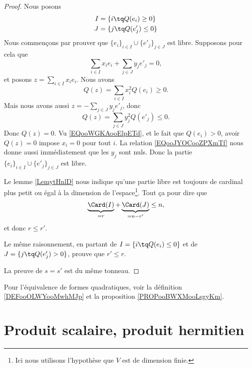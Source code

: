 \begin{proof}
	Nous posons
	\begin{subequations}
		\begin{align}
			I & =\{ i\tq Q(e_i)\geq 0 \}  \\
			J & =\{ j\tq Q(e_j')\leq 0 \}
		\end{align}
	\end{subequations}
	Nous commençons par prouver que \( \{ e_i \}_{i\in I}\cup\{ e'_j \}_{j\in J}\) est libre. Supposons pour cela que
	\begin{equation}
		\sum_{i\in I}x_ie_i+\sum_{j\in J}y_je'_j=0,
	\end{equation}
	et posons \( z=\sum_{i\in I}x_ie_i\). Nous avons
	\begin{equation}        \label{EQooWGKAooElpETd}
		Q(z)=\sum_{i\in I}x_i^2Q(e_i)\geq 0.
	\end{equation}
	Mais nous avons aussi \( z=-\sum_{j\in J}y_je'_j\), donc
	\begin{equation}        \label{EQooJYOCooZPXmTf}
		Q(z)=\sum_{j\in J}y_j^2Q(e'_j)\leq 0.
	\end{equation}
	Donc \( Q(z)=0\). Vu \eqref{EQooWGKAooElpETd}, et le fait que \( Q(e_i)>0\), avoir \( Q(z)=0\) impose \( x_i=0\) pour tout \( i\). La relation \eqref{EQooJYOCooZPXmTf} nous donne aussi immédiatement que les \( y_j\) sont nuls. Donc la partie \( \{ e_i \}_{i\in I}\cup\{ e'_j \}_{j\in J}\) est libre.

	Le lemme \ref{LemytHnlD} nous indique qu'une partie libre est toujours de cardinal plus petit ou égal à la dimension de l'espace\footnote{Ici nous utilisons l'hypothèse que \( V\) est de dimension finie.}. Tout ça pour dire que
	\begin{equation}
		\underbrace{\Card(I)}_{=r}+\underbrace{\Card(J)}_{=n-r'}\leq n,
	\end{equation}
	et donc \( r\leq r'\).

	Le même raisonnement, en partant de \( I=\{ i\tq Q(e_i)\leq 0 \}\) et de \( J=\{ j\tq Q(e'_j)>0 \}\), prouve que \( r'\leq r\).

	La preuve de \( s=s'\) est du même tonneau.
\end{proof}

Pour l'équivalence de formes quadratiques, voir la définition \ref{DEFooOLWYooMwhMJp} et la proposition \ref{PROPooBWXMooLsgyKm}.


\section{Produit scalaire, produit hermitien}

